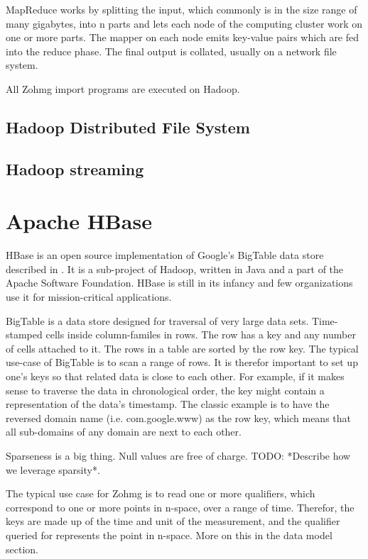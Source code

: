 \documentclass[a4paper,10pt]{book}
\begin{document}
MapReduce works by splitting the input, which commonly is in the size range of many gigabytes, into n parts and lets each node of the computing cluster work on one or more parts. The mapper on each node emits key-value pairs which are fed into the reduce phase. The final output is collated, usually on a network file system.

All Zohmg import programs are executed on Hadoop.


\subsection{Hadoop Distributed File System}

\subsection{Hadoop streaming}

\section{Apache HBase}

HBase is an open source implementation of Google's BigTable data store described in \cite{bigtable}. It is a sub-project of Hadoop, written in Java and a part of the Apache Software Foundation. HBase is still in its infancy and few organizations use it for mission-critical applications.

BigTable is a data store designed for traversal of very large data sets.  Time-stamped cells inside column-familes in rows. The row has a key and any number of cells attached to it. The rows in a table are sorted by the row key.  The typical use-case of BigTable is to scan a range of rows. It is therefor important to set up one's keys so that related data is close to each other. For example, if it makes sense to traverse the data in chronological order, the key might contain a representation of the data's timestamp. The classic example is to have the reversed domain name (i.e.  com.google.www) as the row key, which means that all sub-domains of any domain are next to each other.

Sparseness is a big thing. Null values are free of charge. TODO: *Describe how we leverage sparsity*.

The typical use case for Zohmg is to read one or more qualifiers, which correspond to one or more points in n-space, over a range of time.  Therefor, the keys are made up of the time and unit of the measurement, and the qualifier queried for represents the point in n-space. More on this in the data model section.
\end{document}
